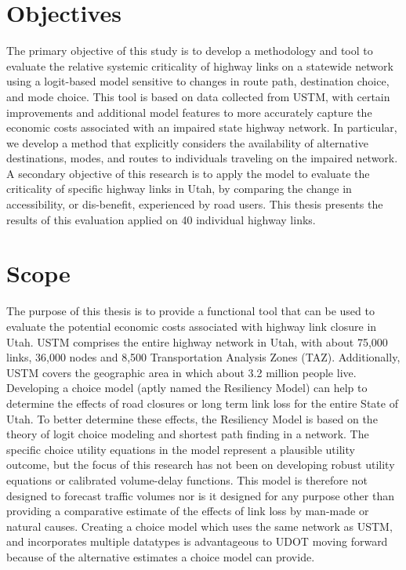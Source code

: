 \section{Objectives}
The primary objective of this study is to develop a methodology and tool to evaluate the
relative systemic criticality of highway links on a statewide network using a logit-based model
sensitive to changes in route path, destination choice, and mode choice.
This tool is based on data collected
from USTM, with certain improvements and additional model
features to more accurately capture the economic costs associated with an impaired state highway
network. In particular, we develop a method that explicitly considers the availability of
alternative destinations, modes, and routes to individuals traveling on the impaired network. A
secondary objective of this research is to apply the model to evaluate the criticality of
specific
highway links in Utah, by comparing the change in accessibility, or dis-benefit,
experienced by road users.
This thesis presents the results of this evaluation applied
on 40 individual highway links.

\section{Scope}
The purpose of this thesis is to provide a functional tool that can be used to evaluate
the potential economic costs associated with highway link closure in Utah. USTM comprises
the entire highway network in Utah, with about 75,000 links, 36,000 nodes and 8,500 Transportation Analysis Zones (TAZ).
Additionally, USTM covers the geographic area in which about 3.2 million people live.
Developing a choice model (aptly named the Resiliency Model) can help to determine
the effects of road closures or long term link loss for the entire State of Utah.
To better determine these effects, the Resiliency Model is based on the theory of logit choice modeling and
shortest path finding in a network. The specific choice utility equations in the model represent
a plausible utility outcome, but the focus of this research has not been on developing robust
utility equations or calibrated volume-delay functions. This model is therefore not designed to
forecast traffic volumes nor is it designed for any purpose other than providing a comparative estimate
of the effects of link loss by man-made or natural causes. Creating a choice model
which uses the same network as USTM, and incorporates multiple datatypes is
advantageous to UDOT moving forward because of the alternative estimates a choice
model can provide.

